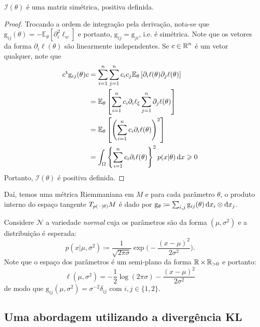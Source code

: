 \begin{proposicao}
	$\mathcal I(\theta)$ é uma matriz simétrica, positiva definida. 
	\begin{proof}
		Trocando a ordem de integração pela derivação, nota-se que $\mathrm{g}_{ij}(\theta) = -\mathbb E_\theta[\partial_i^2\ell_w]$ e portanto, $\mathrm{g}_{ij} = \mathrm{g}_{ji}$, i.e. é simétrica. Note que os vetores da forma $\partial_i \ell(\theta)$ são linearmente independentes. Se $c\in \operatorname{\mathbb{R}}^n$ é um vetor qualquer, note que
		$$
\begin{aligned}
	c^\texttt{t} \mathrm{g}_{ij}(\theta) c & =\sum\limits_{i=1}^n \sum\limits_{j=1}^n c_i c_j \mathbb{E}_{\theta}\left[\partial_i \ell({\theta}) \partial_j \ell(\theta)\right] \\
& =\mathbb{E}_{\theta}\left[\sum\limits_{i=1}^n c_i \partial_i \ell_{\xi} \sum\limits_{j=1}^n \partial_j \ell(\theta)\right] \\
& =\mathbb{E}_{\theta}\left[\left(\sum\limits_{i=1}^n c_i \partial_i \ell(\theta)\right)^2\right] \\
& =\int_{\Omega}\left\{\sum_{i=1}^n c_i \partial_i \ell({\theta})\right\}^2 p(x|\theta)\, {\operatorname{d}}{x} \geqslant 0
\end{aligned}
$$
	Portanto, $\mathcal I(\theta)$ é positiva definida.
	\end{proof}
\end{proposicao}

Daí, temos uma métrica Riemmaniana em $M$ e para cada parâmetro $\theta$, o produto interno do espaço tangente $T_{p(\operatorname{\,\cdot\,}\mid\theta)} M$ é dado por $\mathrm g_{\theta} \coloneqq \sum_{i,j} \mathrm{g}_{ij}(\theta)\,{\operatorname{d}}{x}_i\otimes {\operatorname{d}}{x}_j$.


\begin{exemplo}
	Considere $\mathcal N$ a variedade \textit{normal} cuja os parâmetros são da forma $(\mu, \sigma^2)$ e a distribuição é esperada:
	$$p(x|\mu,\sigma^2) \coloneqq \dfrac{1}{\sqrt{2\pi \sigma}} \exp\Big(-\dfrac{(x-\mu)^2}{2\sigma^2}\Big).$$
	Note que o espaço dos parâmetros é um semi-plano da forma $\operatorname{\mathbb{R}} \times \operatorname{\mathbb{R}}_{>0}$ e portanto:
	\begin{equation*}
		\ell(\mu,\sigma^2) = -\dfrac{1}2\log(2\pi \sigma) - \dfrac{(x-\mu)^2}{2\sigma^2}
	\end{equation*}
	de modo que $\mathrm g_{ij}(\mu,\sigma^2) = \sigma^{-2} \delta_{ij}$ com $i,j \in \{1,2\}$.
\end{exemplo}

\subsection{Uma abordagem utilizando a divergência KL}

